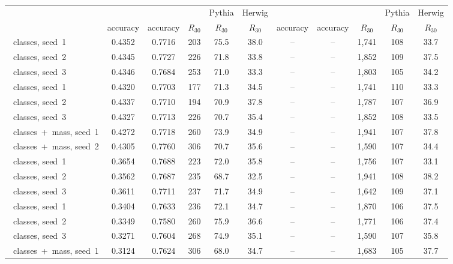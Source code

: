 \begin{landscape}
{\begin{longtable}{@{\extracolsep{\fill}}lcccccccccc@{}}
\cmidrule(lr){5-6}\cmidrule(lr){10-11}
 &  &  &  & Pythia & Herwig &  &  &  & Pythia & Herwig \\
 & accuracy & accuracy & $R_{30}$ & $R_{30}$ & $R_{30}$ & accuracy & accuracy & $R_{30}$ & $R_{30}$ & $R_{30}$ \\
\midrule
\endhead
\bottomrule
\endlastfoot
\mbox{\Kfull{} classes,} \mbox{seed 1} & 0.4352 & 0.7716 & 203 & 75.5 & 38.0 & -- & -- & 1{,}741 & 108 & 33.7 \\*
\mbox{\Kfull{} classes,} \mbox{seed 2} & 0.4345 & 0.7727 & 226 & 71.8 & 33.8 & -- & -- & 1{,}852 & 109 & 37.5 \\*
\mbox{\Kfull{} classes,} \mbox{seed 3} & 0.4346 & 0.7684 & 253 & 71.0 & 33.3 & -- & -- & 1{,}803 & 105 & 34.2 \\
\mbox{\Kres{} classes,} \mbox{seed 1} & 0.4320 & 0.7703 & 177 & 71.3 & 34.5 & -- & -- & 1{,}741 & 110 & 33.3 \\*
\mbox{\Kres{} classes,} \mbox{seed 2} & 0.4337 & 0.7710 & 194 & 70.9 & 37.8 & -- & -- & 1{,}787 & 107 & 36.9 \\*
\mbox{\Kres{} classes,} \mbox{seed 3} & 0.4327 & 0.7713 & 226 & 70.7 & 35.4 & -- & -- & 1{,}852 & 108 & 33.5 \\
\mbox{\Kres{} classes + mass,} \mbox{seed 1} & 0.4272 & 0.7718 & 260 & 73.9 & 34.9 & -- & -- & 1{,}941 & 107 & 37.8 \\*
\mbox{\Kres{} classes + mass,} \mbox{seed 2} & 0.4305 & 0.7760 & 306 & 70.7 & 35.6 & -- & -- & 1{,}590 & 107 & 34.4 \\
\mbox{\Kmid{} classes,} \mbox{seed 1} & 0.3654 & 0.7688 & 223 & 72.0 & 35.8 & -- & -- & 1{,}756 & 107 & 33.1 \\*
\mbox{\Kmid{} classes,} \mbox{seed 2} & 0.3562 & 0.7687 & 235 & 68.7 & 32.5 & -- & -- & 1{,}941 & 108 & 38.2 \\*
\mbox{\Kmid{} classes,} \mbox{seed 3} & 0.3611 & 0.7711 & 237 & 71.7 & 34.9 & -- & -- & 1{,}642 & 109 & 37.1 \\
\mbox{\Kcoarse{} classes,} \mbox{seed 1} & 0.3404 & 0.7633 & 236 & 72.1 & 34.7 & -- & -- & 1{,}870 & 106 & 37.5 \\*
\mbox{\Kcoarse{} classes,} \mbox{seed 2} & 0.3349 & 0.7580 & 260 & 75.9 & 36.6 & -- & -- & 1{,}771 & 106 & 37.4 \\*
\mbox{\Kcoarse{} classes,} \mbox{seed 3} & 0.3271 & 0.7604 & 268 & 74.9 & 35.1 & -- & -- & 1{,}590 & 107 & 35.8 \\
\mbox{\Kcoarse{} classes + mass,} \mbox{seed 1} & 0.3124 & 0.7624 & 306 & 68.0 & 34.7 & -- & -- & 1{,}683 & 105 & 37.7 \\*

\end{longtable}}
\end{landscape}
